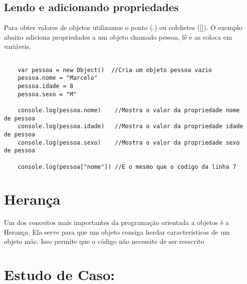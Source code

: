 	\subsection{Lendo e adicionando propriedades}
	Para obter valores de objetos utilizamos o ponto (.) ou colchetes ([]). O exemplo abaixo adiciona propriedades a um objeto chamado pessoa, lê e as coloca em variáveis.
	
	\begin{lstlisting}
	
	var pessoa = new Object()  //Cria um objeto pessoa vazio
	pessoa.nome = "Marcelo"
	pessoa.idade = 8
	pessoa.sexo = "M"
	
	console.log(pessoa.nome)	//Mostra o valor da propriedade nome de pessoa
	console.log(pessoa.idade)	//Mostra o valor da propriedade idade de pessoa
	console.log(pessoa.sexo) 	//Mostra o valor da propriedade sexo de pessoa

	console.log(pessoa["nome"]) //E o mesmo que o codigo da linha 7
	\end{lstlisting}
	
	

    \section{Heran\c{c}a}
	Um dos conceitos mais importantes da programação orientada a objetos é a Herança. Ela serve para que um objeto consiga herdar características de um objeto mãe. Isso permite que o código não necessite de ser reescrito

    \section{Estudo de Caso: }
